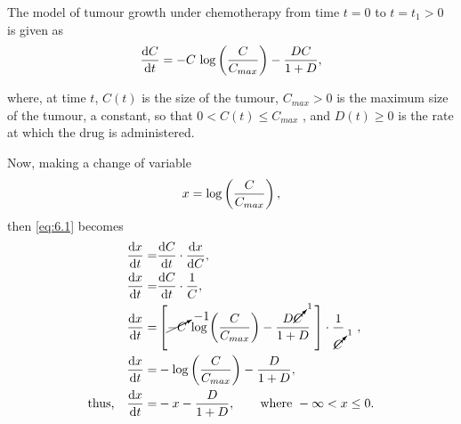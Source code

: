 \def\Cmax{C_{max}}%
The model of tumour growth under chemotherapy from time $t=0$ to $t=t_1>0$ is given as
\begin{equation}
	\label{eq:6.1}
	\deriv{C}{t} = -C\,\log\lr{\frac{C}{\Cmax}} - \frac{DC}{1+D},
\end{equation}

where, at time $t$, $C(t)$ is the size of the tumour, $\Cmax > 0$ is the maximum
size of the tumour, a constant, so that $0 < C(t) \leq \Cmax$ , and $D(t) \geq 0$ is the
rate at which the drug is administered.

Now, making a change of variable
\[
	x = \log\lr{\frac{C}{\Cmax}},
\]
then \eqref{eq:6.1} becomes
\begin{align*}
	\deriv{x}{t} =& \deriv{C}{t}\cdot\deriv{x}{C},\\
	\deriv{x}{t} =& \deriv{C}{t}\cdot \frac{1}{C},\\
	\deriv{x}{t} =& \lrs{\cancelto{-1}{-C}\,\log\lr{\frac{C}{\Cmax}} - \frac{D\cancelto{1}{C}}{1+D}\,\,} \cdot\frac{1}{\cancelto{1}{C}}\quad,\\
	\deriv{x}{t} =& -\log\lr{\frac{C}{\Cmax}} - \frac{D}{1+D},\\
	\textrm{thus,}\quad\deriv{x}{t} =& -x -\frac{D}{1+D}, \qquad\textrm{where } -\infty < x \leq 0.
\end{align*}